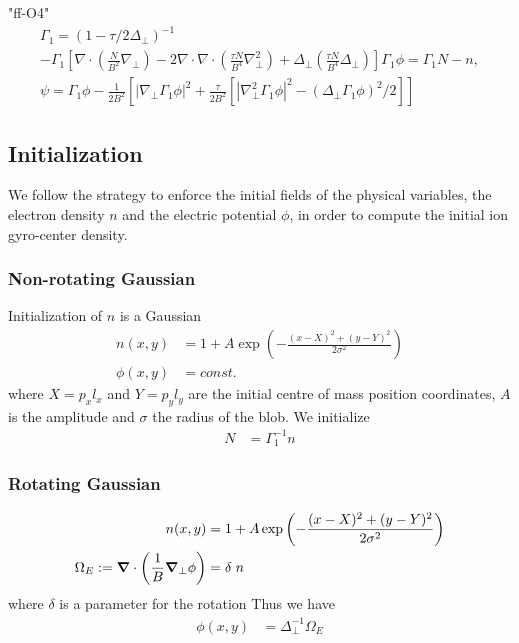 "ff-O4"
\begin{subequations}
\begin{align}
\Gamma_1 = (1- \tau/2\Delta_{\perp})^{-1}\\
 -\Gamma_1 \left[\nabla\cdot \left(\frac{N}{B^2} \nabla_\perp\right)-2   \nabla\cdot\nabla\cdot \left(\frac{\tau N}{B^4} \nabla_\perp^2\right)+  \Delta_{\perp} \left(\frac{\tau N}{B^4} \Delta_{\perp}\right)\right]\Gamma_1 \phi = \Gamma_1 N-n,  \\
\psi = \Gamma_1 \phi - \frac{1}{2 B^2} \left[|\nabla_\perp \Gamma_1\phi|^2 + \frac{\tau}{2 B^2} \left[|\nabla_\perp^2 \Gamma_1\phi |^2 - (\Delta_{\perp} \Gamma_1\phi)^2 /2 \right]\right]
\end{align}
\end{subequations}

\subsection{Initialization}
We follow the strategy to enforce the initial fields of the physical variables, the electron density \(n\) and the electric potential \(\phi\), in order to compute the initial ion gyro-center density.
\subsubsection{Non-rotating Gaussian}
Initialization of $n$ is a Gaussian 
\begin{align}
    n(x,y) &= 1 + A\exp\left( -\frac{(x-X)^2 + (y-Y)^2}{2\sigma^2}\right) \\
    \phi(x,y)&=const.
\end{align}
where $X = p_x l_x$ and $Y=p_yl_y$ are the initial centre of mass position coordinates, $A$ is the amplitude and $\sigma$ the
radius of the blob.
We initialize 
\begin{align}
    N &= \Gamma_1^{-1} n 
\end{align}
\subsubsection{Rotating Gaussian}
\begin{align}
    n(x,y) &= 1 + A\exp\left( -\frac{(x-X)^2 + (y-Y)^2}{2\sigma^2}\right) \\
    \Omega_E:= \vec{\nabla} \cdot \left(\frac{1}{B} \vec{\nabla}_\perp \phi\right) &= \delta \hspace{1mm} n
\end{align}
where \(\delta\) is a parameter for the rotation
Thus we have
\begin{align}
  \phi(x,y) &= \Delta_\perp^{-1} \Omega_E
\end{align}

